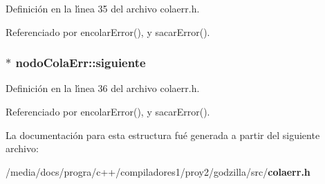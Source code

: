 Definici\'{o}n en la l\'{\i}nea 35 del archivo colaerr.h.

Referenciado por encolar\-Error(), y sacar\-Error().
\subsubsection{$\ast$ {\bf nodo\-Cola\-Err::siguiente}}\label{structnodoColaErr_o1}




Definici\'{o}n en la l\'{\i}nea 36 del archivo colaerr.h.

Referenciado por encolar\-Error(), y sacar\-Error().

La documentaci\'{o}n para esta estructura fu\'{e} generada a partir del siguiente archivo:\begin{CompactItemize}
\item 
/media/docs/progra/c++/compiladores1/proy2/godzilla/src/{\bf colaerr.h}\end{CompactItemize}
